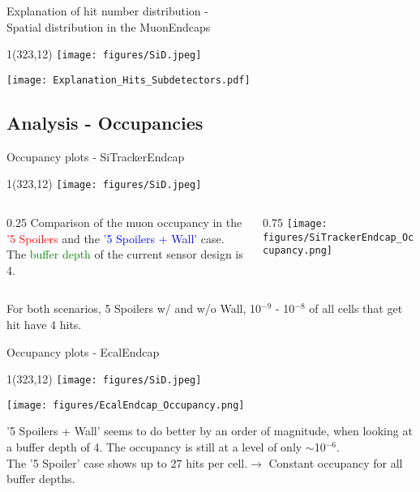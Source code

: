\documentclass[xcolor={dvipsnames}]{beamer}
\newcommand{\sidlogo}{
  \setlength{\TPHorizModule}{1pt}
  \setlength{\TPVertModule}{1pt}
  \begin{textblock}{1}(323,12)
   \texttt{[image: figures/SiD.jpeg]}
  \end{textblock}
  }
\begin{document}
\begin{frame}{Explanation of hit number distribution -\\ \small Spatial distribution in the MuonEndcaps}
\sidlogo
 \begin{center}
\texttt{[image: Explanation\_Hits\_Subdetectors.pdf]}
\end{center}
\end{frame}

\subsection{Analysis - Occupancies}
\begin{frame}{Occupancy plots - \small SiTrackerEndcap}
\sidlogo
\begin{columns}
 \begin{column}{0.25\textwidth}
 \small
  Comparison of the muon occupancy in the \textcolor{red}{'5 Spoilers} and the \textcolor{blue}{'5 Spoilers + Wall'} case.\\{\small The \textcolor{green}{buffer depth} of the current sensor design is 4.}
 \end{column}
 \begin{column}{0.75\textwidth}
\texttt{[image: figures/SiTrackerEndcap\_Occupancy.png]}
\end{column}
\end{columns}
For both scenarios, 5 Spoilers w/ and w/o Wall, 10$^{-9}$ - 10$^{-8}$ of all cells that get hit have 4 hits.
\end{frame}
\begin{frame}{Occupancy plots - \small EcalEndcap}
\sidlogo
 \begin{center}
\texttt{[image: figures/EcalEndcap\_Occupancy.png]}
\end{center}
\small '5 Spoilers + Wall' seems to do better by an order of magnitude, when looking at a buffer depth of 4. The occupancy is still at a level of only $\sim$10$^{-6}$.\\
\small The '5 Spoiler' case shows up to 27 hits per cell.$\rightarrow$ Constant occupancy for all buffer depths.
\end{frame}
\end{document}
